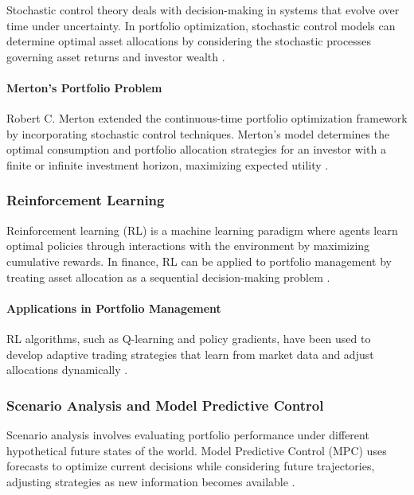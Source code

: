 Stochastic control theory deals with decision-making in systems that evolve over time under uncertainty. In portfolio optimization, stochastic control models can determine optimal asset allocations by considering the stochastic processes governing asset returns and investor wealth \cite{merton1969lifetime}.

\paragraph{Merton's Portfolio Problem}

Robert C. Merton extended the continuous-time portfolio optimization framework by incorporating stochastic control techniques. Merton's model determines the optimal consumption and portfolio allocation strategies for an investor with a finite or infinite investment horizon, maximizing expected utility \cite{merton1971optimum}.

\subsubsection{Reinforcement Learning}

Reinforcement learning (RL) is a machine learning paradigm where agents learn optimal policies through interactions with the environment by maximizing cumulative rewards. In finance, RL can be applied to portfolio management by treating asset allocation as a sequential decision-making problem \cite{moody1998performance}.

\paragraph{Applications in Portfolio Management}

RL algorithms, such as Q-learning and policy gradients, have been used to develop adaptive trading strategies that learn from market data and adjust allocations dynamically \cite{almahdi2019adaptive}.

\subsubsection{Scenario Analysis and Model Predictive Control}

Scenario analysis involves evaluating portfolio performance under different hypothetical future states of the world. Model Predictive Control (MPC) uses forecasts to optimize current decisions while considering future trajectories, adjusting strategies as new information becomes available \cite{primbs2009dynamic}.

